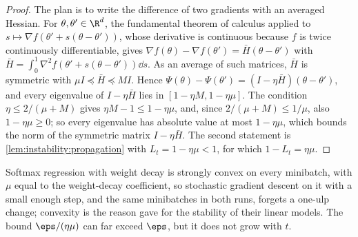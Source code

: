 \begin{refsection}

\begin{proof}
The plan is to write the difference of two gradients with an averaged Hessian. For $\theta,\theta'\in\R^d$, the fundamental theorem of calculus applied to $s\mapsto\nabla f(\theta'+s(\theta-\theta'))$, whose derivative is continuous because $f$ is twice continuously differentiable, gives $\nabla f(\theta)-\nabla f(\theta')=\bar H(\theta-\theta')$ with $\bar H=\int_0^1\nabla^2f(\theta'+s(\theta-\theta'))\dd s$. As an average of such matrices, $\bar H$ is symmetric with $\mu I\preceq\bar H\preceq MI$. Hence $\Psi(\theta)-\Psi(\theta')=(I-\eta\bar H)(\theta-\theta')$, and every eigenvalue of $I-\eta\bar H$ lies in $[1-\eta M,1-\eta\mu]$. The condition $\eta\le2/(\mu+M)$ gives $\eta M-1\le1-\eta\mu$, and, since $2/(\mu+M)\le1/\mu$, also $1-\eta\mu\ge0$; so every eigenvalue has absolute value at most $1-\eta\mu$, which bounds the norm of the symmetric matrix $I-\eta\bar H$. The second statement is \cref{lem:instability:propagation} with $L_t=1-\eta\mu<1$, for which $1-L_t=\eta\mu$.
\end{proof}

Softmax regression with weight decay is strongly convex on every minibatch, with $\mu$ equal to the weight-decay coefficient, so stochastic gradient descent on it with a small enough step, and the same minibatches in both runs, forgets a one-ulp change; convexity is the reason \textcite{SummersDinneen2021} gave for the stability of their linear models. The bound $\eps/(\eta\mu)$ can far exceed $\eps$, but it does not grow with $t$.



\end{refsection}

